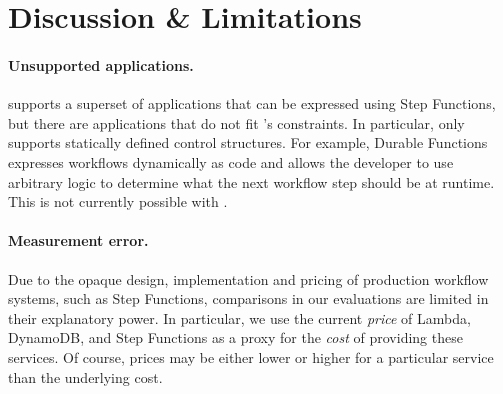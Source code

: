 \section{Discussion \& Limitations}\label{sec:limitations}


\paragraph{Unsupported applications.} \name{} supports a superset of
applications that can be expressed using Step Functions, but there are
applications that do not fit \name{}'s constraints. In particular, \name{} only
supports statically defined control structures. For example, Durable Functions
expresses workflows dynamically as code and allows the developer to use
arbitrary logic to determine what the next workflow step should be at runtime.
This is not currently possible with \name{}.

\paragraph{Measurement error.} Due to the opaque design, implementation and
pricing of production workflow systems, such as Step Functions, comparisons in
our evaluations are limited in their explanatory power. In particular, we use
the current \emph{price} of Lambda, DynamoDB, and Step Functions as a proxy for
the \emph{cost} of providing these services. Of course, prices may be either
lower or higher for a particular service than the underlying cost.


